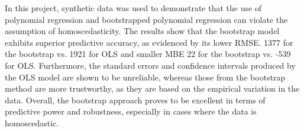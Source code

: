 In this project, synthetic data was used to demonstrate that the use of polynomial regression and bootstrapped polynomial regression can violate the assumption of homoscedasticity. The results show that the bootstrap model exhibits superior predictive accuracy, as evidenced by its lower RMSE. 1377 for the bootstrap vs. 1921 for OLS and smaller MBE 22 for the bootstrap vs. -539 for OLS. Furthermore, the standard errors and confidence intervals produced by the OLS model are shown to be unreliable, whereas those from the bootstrap method are more trustworthy, as they are based on the empirical variation in the data. Overall, the bootstrap approach proves to be excellent in terms of predictive power and robustness, especially in cases where the data is homoscedastic.